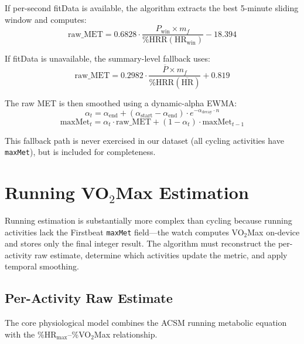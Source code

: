 \documentclass[11pt,a4paper]{article}
\begin{document}
If per-second fitData is available, the algorithm extracts the best 5-minute sliding window and computes:
\begin{equation}
\text{raw\_MET} = 0.6828 \cdot \frac{P_{\text{win}} \times m_f}{\%\text{HRR}(\text{HR}_{\text{win}})} - 18.394
\label{eq:cyc-windowed}
\end{equation}

If fitData is unavailable, the summary-level fallback uses:
\begin{equation}
\text{raw\_MET} = 0.2982 \cdot \frac{\overline{P} \times m_f}{\%\text{HRR}(\overline{\text{HR}})} + 0.819
\label{eq:cyc-summary}
\end{equation}

The raw MET is then smoothed using a dynamic-alpha EWMA:
\begin{equation}
\alpha_t = \alpha_{\text{end}} + (\alpha_{\text{start}} - \alpha_{\text{end}}) \cdot e^{-\alpha_{\text{decay}} \cdot n}
\label{eq:cyc-dynamic-alpha}
\end{equation}
\begin{equation}
\text{maxMet}_t = \alpha_t \cdot \text{raw\_MET} + (1 - \alpha_t) \cdot \text{maxMet}_{t-1}
\end{equation}

This fallback path is never exercised in our dataset (all cycling activities have \texttt{maxMet}), but is included for completeness.


\section{Running VO$_2$Max Estimation}
\label{sec:running}

Running estimation is substantially more complex than cycling because running activities lack the Firstbeat \texttt{maxMet} field---the watch computes VO$_2$Max on-device and stores only the final integer result.
The algorithm must reconstruct the per-activity raw estimate, determine which activities update the metric, and apply temporal smoothing.

\subsection{Per-Activity Raw Estimate}
\label{sec:raw-estimate}

The core physiological model combines the ACSM running metabolic equation with the \%HR$_{\text{max}}$--\%VO$_2$Max relationship.
\end{document}
